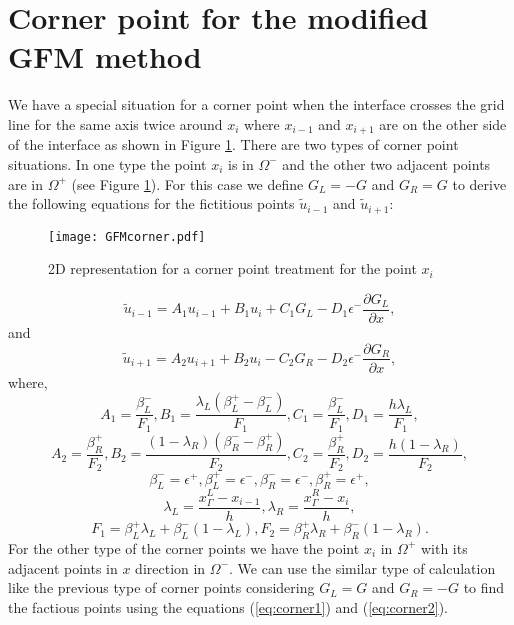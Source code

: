 \section{Corner point for the modified GFM method}
We have a special situation for a corner point when the interface crosses the grid line for the same axis twice around $x_i$ where $x_{i-1}$ and $x_{i+1}$ are on the other side of the interface as shown in Figure \ref{fig:corner_point}. There are two types of corner point situations. In one type the point $x_i$ is in $\Omega^-$ and the other two adjacent points are in $\Omega^+$ (see Figure \ref{fig:corner_point}). For this case we define $G_L=-G$ and $G_R = G$ to derive the following equations for the fictitious points $\tilde{u}_{i-1}$ and $\tilde{u}_{i+1}$: 
\begin{figure}[!h]		
\begin{center}
	\texttt{[image: GFMcorner.pdf]}		
\end{center}
\caption{2D representation for a corner point treatment for the point $x_i$ }
\label{fig:corner_point}
\end{figure}
\begin{equation}
	\tilde{u}_{i-1}= A_1 u_{i-1}+B_1 u_{i} + C_1 G_L- D_1 \epsilon^- \frac{\partial G_L}{\partial x},\label{eq:corner1}
\end{equation}
and
\begin{equation}	
	\tilde{u}_{i+1}= A_2 u_{i+1}+B_2 u_{i} - C_2 G_R- D_2 \epsilon^- \frac{\partial G_R}{\partial x},\label{eq:corner2}
\end{equation}
where,
    $$	A_1 = \frac{\beta^-_L}{F_1}, B_1  = \frac{\lambda_L(\beta^+_L-\beta^-_L)}{F_1}, C_1 = \frac{\beta^-_L}{F_1},D_1 = \frac{h \lambda_L}{F_1}, $$ %
	$$A_2 = \frac{\beta^+_R}{F_2}, B_2  = \frac{(1-\lambda_R)(\beta^-_R-\beta^+_R)}{F_2}, C_2 = \frac{\beta^+_R}{F_2},D_2 = \frac{h(1- \lambda_R)}{F_2},$$
	$$\beta_L^-=\epsilon^+,\beta_L^+=\epsilon^-,\beta_R^-=\epsilon^-,\beta_R^+=\epsilon^+,$$
	$$\lambda_L=\frac{x^L_\Gamma-x_{i-1}}{h},\lambda_R=\frac{x^R_\Gamma-x_i}{h},$$
	$$F_1 = \beta^+_L \lambda_L+\beta^-_L(1-\lambda_L), F_2 = \beta^+_R \lambda_R+\beta^-_R(1-\lambda_R).$$
For the other type of the corner points we have the point $x_i$ in $ \Omega^+$ with its adjacent points in $x$ direction in $\Omega^-$. We can use the similar type of calculation like the previous type of corner points considering $G_L=G$ and $G_R = -G$ to find the factious points using the equations (\ref{eq:corner1}) and (\ref{eq:corner2}). 


